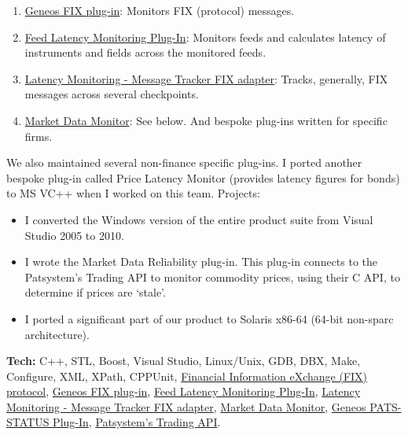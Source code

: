 \documentclass[
  a4paper,
]{article}
\providecommand{\tightlist}{%
  \setlength{\itemsep}{0pt}\setlength{\parskip}{0pt}}
\begin{document}
\begin{multicols*}{2}
\begin{enumerate}
\def\labelenumi{\arabic{enumi}.}
\tightlist
\item
  \href{https://docs.itrsgroup.com/docs/geneos/5.1.0/Netprobe/trading_fix/fix.html}{Geneos
  FIX plug-in}: Monitors FIX (protocol) messages.
\item
  \href{https://docs.itrsgroup.com/docs/geneos/5.2.0/Netprobe/market_data_monitoring/feedadapter_ug.html}{Feed
  Latency Monitoring Plug-In}: Monitors feeds and calculates latency of
  instruments and fields across the monitored feeds.
\item
  \href{https://docs.itrsgroup.com/docs/geneos/5.2.0/Netprobe/latency_monitoring/message_tracker/fix_adapter.html}{Latency
  Monitoring - Message Tracker FIX adapter}: Tracks, generally, FIX
  messages across several checkpoints.
\item
  \href{https://docs.itrsgroup.com/docs/geneos/5.2.0/Netprobe/market_data_monitoring/mdm_ug.html}{Market
  Data Monitor}: See below. And bespoke plug-ins written for specific
  firms.
\end{enumerate}

We also maintained several non-finance specific plug-ins. I ported
another bespoke plug-in called Price Latency Monitor (provides latency
figures for bonds) to MS VC++ when I worked on this team. Projects:

\begin{itemize}
\tightlist
\item
  I converted the Windows version of the entire product suite from
  Visual Studio 2005 to 2010.
\item
  I wrote the Market Data Reliability plug-in. This plug-in connects to
  the Patsystem's Trading API to monitor commodity prices, using their C
  API, to determine if prices are `stale'.
\item
  I ported a significant part of our product to Solaris x86-64 (64-bit
  non-sparc architecture).
\end{itemize}

\textbf{Tech:} C++, STL, Boost, Visual Studio, Linux/Unix, GDB, DBX,
Make, Configure, XML, XPath, CPPUnit,
\href{https://en.wikipedia.org/wiki/Financial_Information_eXchange}{Financial
Information eXchange (FIX) protocol},
\href{https://docs.itrsgroup.com/docs/geneos/5.1.0/Netprobe/trading_fix/fix.html}{Geneos
FIX plug-in},
\href{https://docs.itrsgroup.com/docs/geneos/5.2.0/Netprobe/market_data_monitoring/feedadapter_ug.html}{Feed
Latency Monitoring Plug-In},
\href{https://docs.itrsgroup.com/docs/geneos/5.2.0/Netprobe/latency_monitoring/message_tracker/fix_adapter.html}{Latency
Monitoring - Message Tracker FIX adapter},
\href{https://docs.itrsgroup.com/docs/geneos/5.2.0/Netprobe/market_data_monitoring/mdm_ug.html}{Market
Data Monitor},
\href{https://docs.itrsgroup.com/docs/geneos/5.1.0/Netprobe/trading_pats/pats-status.html}{Geneos
PATS-STATUS Plug-In}, \href{www.patsystems.com}{Patsystem's Trading
API}.


\end{multicols*}
\end{document}
